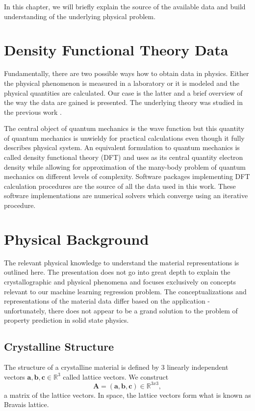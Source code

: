 \documentclass[11pt,oneside,czech,american]{book} %
\theoremstyle{plain}
\theoremstyle{definition}
\begin{document}
In this chapter, we will briefly explain the source of the available data and build understanding of the underlying physical problem.
\section{Density Functional Theory Data} \label{DFT}
Fundamentally, there are two possible ways how to obtain data in physics. Either the physical phenomenon is measured in a laboratory or it is modeled and the physical quantities are calculated. Our case is the latter and a brief overview of the way the data are gained is presented. The underlying theory was studied in the previous work \parencite{jurka}.

The central object of quantum mechanics is the wave function but this quantity of quantum mechanics is unwieldy for practical calculations even though it fully describes physical system. An equivalent formulation to quantum mechanics is called density functional theory (DFT) and uses as its central quantity electron density while allowing for approximation of the many-body problem of quantum mechanics on different levels of complexity. Software packages implementing DFT calculation procedures are the source of all the data used in this work. These software implementations are numerical solvers which converge using an iterative procedure.


\section{Physical Background} \label{physical}
The relevant physical knowledge to understand the material representations is outlined here. The presentation does not go into great depth to explain the crystallographic and physical phenomena and focuses exclusively on concepts relevant to our machine learning regression problem. The conceptualizations and representations of the material data differ based on the application - unfortunately, there does not appear to be a grand solution to the problem of property prediction in solid state physics.
\subsection{Crystalline Structure} \label{reducedhere}
The structure of a crystalline material is defined by 3 linearly independent vectors $\boldsymbol{a}, \boldsymbol{b}, \boldsymbol{c} \in \mathbb{R}^3$ called lattice vectors. We construct
\begin{equation}
	\bm{A} = (\boldsymbol{a}, \boldsymbol{b}, \boldsymbol{c}) \in \mathbb{R}^{3x3},
\end{equation}
a matrix of the lattice vectors. In space, the lattice vectors form what is known as Bravais lattice.
\end{document}
